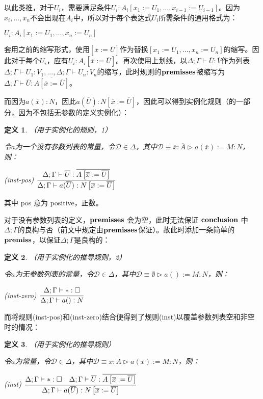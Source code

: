 \documentclass[UTF8]{article}
\newtheorem{thm}{定义}[section]
\begin{document}
		以此类推，对于$U_i$，需要满足条件$U_i:A_i\left[x_1:=U_1,...,x_{i-1}:=U_{i-1}\right]$。因为$x_i,...,x_n$不会出现在$A_i$中，所以对于每个表达式$U_i$所需条件的通用格式为：
		
		$U_i:A_i\left[x_1:=U_1,...,x_n:=U_n\right]$
		
		套用之前的缩写形式，使用$\left[\overline{x}:=\overline{U}\right]$作为替换$\left[x_1:=U_1,...,x_n:=U_n\right]$的缩写。因此对于每个$U_i$，应有$U_i:A_i\left[\overline{x}:=\overline{U}\right]$。再次使用上划线，以$\Delta;\Gamma\vdash\overline{U}:\overline{V}$作为列表$\Delta;\Gamma\vdash U_1:V_1,...,\Delta;\Gamma\vdash U_n:V_n$的缩写，此时规则的$\bf premisses$被缩写为$\Delta;\Gamma\vdash\overline{U}:\overline{A\left[\overline{x}:=\overline{U}\right]}$。
		
		而因为$a(\overline{x}):N$，因此$a(\overline{U}):N\left[\overline{x}:=\overline{U}\right]$，因此可以得到实例化规则（的一部分，因为不包括无参数的定义实例化）：
		
		\begin{thm}（用于实例化的规则，1）
			
			\noindent
			令$a$为一个没有参数列表的常量，令$\mathcal{D}\in\Delta$，其中$\mathcal{D}\equiv\overline{x}:\overline{A}\triangleright a(\overline{x}):=M:N$，则：
			
			(inst-pos) $\cfrac{\Delta;\Gamma\vdash\overline{U}:\overline{A\left[\overline{x}:=\overline{U}\right]}}{\Delta;\Gamma\vdash a(\overline{U}):N\left[\overline{x}:=\overline{U}\right]}$
		\end{thm}
	
		其中 pos 意为 positive，正数。
		
		对于没有参数列表的定义，$\bf premisses$ 会为空，此时无法保证 $\bf conclusion$ 中$\Delta;\Gamma$的良构与否（前文中规定由$\bf premisses$保证）。故此时添加一条简单的$\bf premiss$，以保证$\Delta;\Gamma$是良构的：
		
		\begin{thm}（用于实例化的推导规则，2）
			
			\noindent
			令$a$为无参数列表的常量，令$\mathcal{D}\in\Delta$，其中$\mathcal{D}\equiv\emptyset\triangleright a():=M:N$，则：
			
			(inst-zero) $\cfrac{\Delta;\Gamma\vdash*:\square}{\Delta;\Gamma\vdash a():N}$
		\end{thm}
	
		而将规则(inst-pos)和(inst-zero)结合便得到了规则(inst)以覆盖参数列表空和非空时的情况：
		
		\begin{thm}（用于实例化的推导规则）
			
			\noindent
			令$a$为常量，令$\mathcal{D}\in\Delta$，其中$\mathcal{D}\equiv\overline{x}:\overline{A}\triangleright a(\overline{x}):=M:N$，则：
			
			(inst) $\cfrac{\Delta;\Gamma\vdash*:\square\ \ \ \Delta;\Gamma\vdash\overline{U}:\overline{A\left[\overline{x}:=\overline{U}\right]}}{\Delta;\Gamma\vdash a(\overline{U}):N\left[\overline{x}:=\overline{U}\right]}$
		\end{thm}
\end{document}
